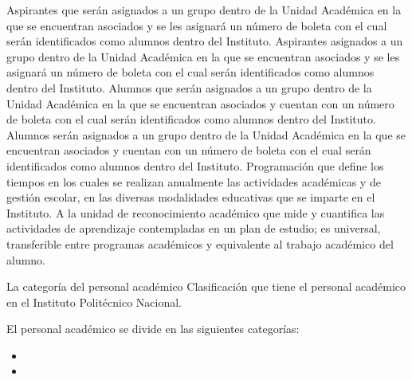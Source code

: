 \begin{bGlosario}
		Aspirantes que serán asignados a un grupo dentro de la Unidad Académica en la que se encuentran asociados y se les asignará un número de boleta con el cual serán identificados como alumnos dentro del Instituto.
	 Aspirantes asignados a un grupo dentro de la Unidad Académica en la que se encuentran asociados y se les asignará un número de boleta con el cual serán identificados como alumnos dentro del Instituto.
	 Alumnos que serán asignados a un grupo dentro de la Unidad Académica en la que se encuentran asociados y cuentan con un número de boleta con el cual serán identificados como alumnos dentro del Instituto.
	 Alumnos serán asignados a un grupo dentro de la Unidad Académica en la que se encuentran asociados y cuentan con un número de boleta con el cual serán identificados como alumnos dentro del Instituto.
 	 Programación que define los tiempos en los cuales se realizan anualmente las actividades académicas y de gestión escolar, en las diversas modalidades educativas que se imparte en el Instituto.
	  A la unidad de reconocimiento académico que mide y cuantifica las actividades de aprendizaje contempladas en un plan de estudio; es universal, transferible entre programas académicos y equivalente al trabajo académico del alumno.

	  La categoría del personal académico  
	 Clasificación que tiene el personal académico en el Instituto Politécnico Nacional.
	 
	  El personal académico se divide en las siguientes categorías:
	 \begin{itemize}
	 	\item {}
	 	\item {}
	 \end{itemize}
	 

\end{bGlosario}
